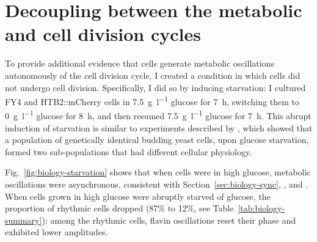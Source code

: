 \section{Decoupling between the metabolic and cell division cycles}
\label{sec:biology-abrupt}


To provide additional evidence that cells generate metabolic oscillations autonomously of the cell division cycle, I created a condition in which cells did not undergo cell division.
Specifically, I did so by inducing starvation: I cultured FY4 and HTB2::mCherry cells in \SI{7.5}{\gram~\litre^{-1}} glucose for \SI{7}{\hour}, switching them to \SI{0}{\gram~\litre^{-1}} glucose for \SI{8}{\hour}, and then resumed \SI{7.5}{\gram~\litre^{-1}} glucose for \SI{7}{\hour}.
This abrupt induction of starvation is similar to experiments described by \textcite{bagameryPutativeBetHedgingStrategy2020}, which showed that a population of genetically identical budding yeast cells, upon glucose starvation, formed two sub-populations that had different cellular physiology.

Fig.\ \ref{fig:biology-starvation} shows that when cells were in high glucose, metabolic oscillations were asynchronous, consistent with Section~\ref{sec:biology-sync}, \textcite{papagiannakisAutonomousMetabolicOscillations2017}, and \textcite{baumgartnerFlavinbasedMetabolicCycles2018}.
When cells grown in high glucose were abruptly starved of glucose, the proportion of rhythmic cells dropped (87\% to 12\%, see Table~\ref{tab:biology-summary}); among the rhythmic cells, flavin oscillations reset their phase and exhibited lower amplitudes.

